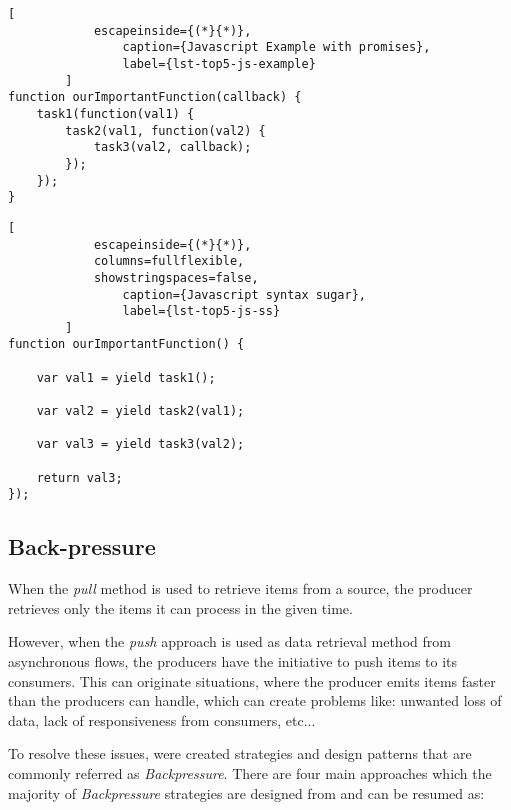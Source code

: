 	\begin{center}
		\lstset{basicstyle=\scriptsize\ttfamily,frame=bottomline}
		\begin{minipage}[t][][b]{.46\textwidth}
		\begin{lstlisting}[
			escapeinside={(*}{*)},
				caption={Javascript Example with promises},
				label={lst-top5-js-example}
		]
function ourImportantFunction(callback) {
	task1(function(val1) {
		task2(val1, function(val2) {
			task3(val2, callback);
		});
	});
}
		\end{lstlisting}
		\end{minipage}
		\hfill
		\begin{minipage}{.48\textwidth}
		\lstset{basicstyle=\scriptsize\ttfamily,frame=bottomline}
		\begin{lstlisting}[
			escapeinside={(*}{*)},
			columns=fullflexible,
			showstringspaces=false,
				caption={Javascript syntax sugar},
				label={lst-top5-js-ss}
		]
function ourImportantFunction() {
	
	var val1 = yield task1();
	
	var val2 = yield task2(val1);
	
	var val3 = yield task3(val2);

	return val3;
});

		\end{lstlisting}
		\end{minipage}
	\end{center}


	
	\clearpage

	\subsection{Back-pressure} 

	When the \textit{pull} method is used to retrieve items from a source, the producer retrieves only the items it can process in the given time. 
	
	However, when the \textit{push} approach is used as data retrieval method from asynchronous flows, the producers have the initiative to push items to its consumers. 
	This can originate situations, where the producer emits items faster than the producers can handle, which can create problems like: unwanted loss of data, lack of responsiveness from consumers, etc... 
	
	To resolve these issues, were created strategies and design patterns that are commonly referred as \textit{Backpressure}.
	There are four main approaches which the majority of \textit{Backpressure} strategies are designed from and can be resumed as: 
	
